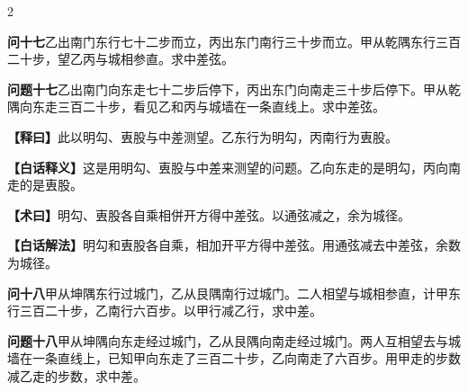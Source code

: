 \documentclass[11pt,a4paper]{article}
\newcommand{\WenQuestion}[1]{\textbf{\textcolor{classicalcolor}{#1}}}
\newcommand{\BaiQuestion}[1]{\textbf{\textcolor{moderncolor}{#1}}}
\newcommand{\WenExplain}{\textcolor{classicalcolor}{\textbf{【释曰】}}}
\newcommand{\BaiExplain}{\textcolor{moderncolor}{\textbf{【白话释义】}}}
\newcommand{\WenMethod}{\textcolor{classicalcolor}{\textbf{【术曰】}}}
\newcommand{\BaiMethod}{\textcolor{moderncolor}{\textbf{【白话解法】}}}
\begin{document}
\begin{paracol}{2}
\vspace{0.8em}

\switchcolumn*
\begin{tcolorbox}[colback=red!3,colframe=red!30!black,boxrule=0.3pt]
\WenQuestion{问十七}\quad 乙出南门东行七十二步而立，丙出东门南行三十步而立。甲从乾隅东行三百二十步，望乙丙与城相参直。求中差弦。
\end{tcolorbox}
\switchcolumn
\begin{tcolorbox}[colback=blue!3,colframe=blue!30!black,boxrule=0.3pt]
\BaiQuestion{问题十七}\quad 乙出南门向东走七十二步后停下，丙出东门向南走三十步后停下。甲从乾隅向东走三百二十步，看见乙和丙与城墙在一条直线上。求中差弦。
\end{tcolorbox}

\switchcolumn*
\begin{tcolorbox}[colback=red!5,colframe=red!30!black,boxrule=0.3pt]
\WenExplain\quad 此以明勾、叀股与中差测望。乙东行为明勾，丙南行为叀股。
\end{tcolorbox}
\switchcolumn
\begin{tcolorbox}[colback=blue!5,colframe=blue!30!black,boxrule=0.3pt]
\BaiExplain\quad 这是用明勾、叀股与中差来测望的问题。乙向东走的是明勾，丙向南走的是叀股。
\end{tcolorbox}

\switchcolumn*
\begin{tcolorbox}[colback=red!5,colframe=red!40!black,boxrule=0.3pt]
\WenMethod\quad 明勾、叀股各自乘相併开方得中差弦。以通弦减之，余为城径。
\end{tcolorbox}
\switchcolumn
\begin{tcolorbox}[colback=blue!5,colframe=blue!40!black,boxrule=0.3pt]
\BaiMethod\quad 明勾和叀股各自乘，相加开平方得中差弦。用通弦减去中差弦，余数为城径。
\end{tcolorbox}

\vspace{0.8em}

\switchcolumn*
\begin{tcolorbox}[colback=red!3,colframe=red!30!black,boxrule=0.3pt]
\WenQuestion{问十八}\quad 甲从坤隅东行过城门，乙从艮隅南行过城门。二人相望与城相参直，计甲东行三百二十步，乙南行六百步。以甲行减乙行，求中差。
\end{tcolorbox}
\switchcolumn
\begin{tcolorbox}[colback=blue!3,colframe=blue!30!black,boxrule=0.3pt]
\BaiQuestion{问题十八}\quad 甲从坤隅向东走经过城门，乙从艮隅向南走经过城门。两人互相望去与城墙在一条直线上，已知甲向东走了三百二十步，乙向南走了六百步。用甲走的步数减乙走的步数，求中差。
\end{tcolorbox}


\end{paracol}
\end{document}
